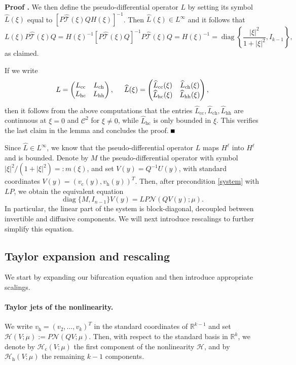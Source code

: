 \documentclass[10pt]{article}
\newenvironment{Proof}[1][\unskip]%
 {\begin{trivlist} \item[]{\bf Proof #1. }}%
 {\hspace*{\fill}$\rule{.4\baselineskip}{.4\baselineskip}$\end{trivlist}}
\newcommand{\R}{\mathbb{R}}
\newcommand{\Nl}{\mathcal{N}}
\newcommand{\That}{\widehat{\mathcal{T}}}
\newcommand{\diag}{\operatorname{diag}}
\begin{document}
\begin{Proof}
 We then define the pseudo-differential operator $L$ by setting its symbol $\widehat{L}(\xi)$ equal to $[P\That(\xi)QH(\xi)]^{-1}$. Then $\widehat{L} (\xi) \in L^\infty$ and it follows that
 \[
 L(\xi)P\That(\xi)Q = H(\xi)^{-1}\left[P\That(\xi)Q\right]^{-1}P\That(\xi)Q = H(\xi)^{-1}=\diag\left\{\dfrac{|\xi|^2}{1+|\xi|^2},I_{k-1}\right\},
 \]
 as claimed.
 
 If we write
\[
L  = \begin{pmatrix}
L_\mathrm{cc} & L_\mathrm{ch} \\
L_\mathrm{hc} & L_\mathrm{hh} 
\end{pmatrix}, \hspace{0.2in}
\widehat{L}(\xi)  = \begin{pmatrix}
\widehat{L}_\mathrm{cc}(\xi) & \widehat{L}_\mathrm{ch}(\xi) \\
\widehat{L}_\mathrm{hc}(\xi) & \widehat{L}_\mathrm{hh}(\xi) 
\end{pmatrix},
\]
then it follows from the above computations that the entries $\widehat{L}_\mathrm{cc}, \widehat{L}_\mathrm{ch},\widehat{L}_\mathrm{hh}$ are continuous at $\xi = 0$ and $\mathscr{C}^2$ for $\xi \neq 0$, while $\widehat{L}_\mathrm{hc}$ is only bounded in $\xi$. This verifies the last claim in the lemma and concludes the proof. 
 \end{Proof}
 
 
 Since $\widehat{L} \in L^\infty$, we know that the pseudo-differential operator $L$ maps $H^\ell$ into $H^\ell$ and is bounded. Denote by $M$ the pseudo-differential operator with symbol $|\xi|^2/(1+|\xi|^2)=: m(\xi)$, and set $V(y)=Q^{-1}U(y)$, with standard coordinates $V(y)=(v_\mathrm{c}(y),v_\mathrm{h}(y))^T$. Then, after precondition \eqref{system} with $LP$, we obtain the equivalent equation
\begin{equation}\label{TranEq}
{\diag{\{M, I_{n-1}\}}} V(y)=LP\Nl(QV(y);\mu).
\end{equation}
In particular, the linear part of the system is block-diagonal, decoupled between invertible and diffusive components. We will  next introduce rescalings to further simplify this equation.



\subsection{Taylor expansion and rescaling}\label{s:2.2}
We start by expanding our bifurcation equation and then introduce appropriate scalings. 
\paragraph{Taylor jets of the nonlinearity.} 
We write $v_\mathrm{h} = (v_2,\ldots,v_{k})^T$ in the standard coordinates of $\R^{k-1}$ and set $\mathcal{H}(V;\mu) :=P\Nl(QV;\mu)$. Then, with respect to the standard basis in $\R^k$, we denote by $\mathcal{H}_\mathrm{c}(V;\mu)$ the first component of the nonlinearity $\mathcal{H}$, and by $\mathcal{H}_\mathrm{h}(V;\mu)$ the remaining $k-1$ components. 
\end{document}
